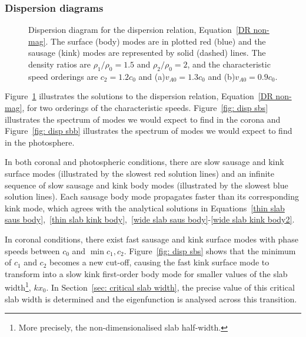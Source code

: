 \documentclass[12pt]{../style-files/ociamthesis}
\begin{document}
\subsubsection{Dispersion diagrams} \label{sec: disp diagrams}

\begin{figure}[]
	\centering
	\caption{Dispersion diagram for the dispersion relation, Equation~\eqref{DR non-mag}. The surface (body) modes are in plotted red (blue) and the sausage (kink) modes are represented by solid (dashed) lines. The density ratios are $\rho_1/\rho_0 = 1.5$ and $\rho_2/\rho_0 = 2$, and the characteristic speed orderings are $c_2 = 1.2c_0$ and (a)$v_{A0} = 1.3c_0$ and (b)$v_{A0} = 0.9c_0$.}
	\label{fig: disp}
\end{figure}

Figure~\ref{fig: disp} illustrates the solutions to the dispersion relation, Equation~\eqref{DR non-mag}, for two orderings of the characteristic speeds. Figure~\ref{fig: disp sbs} illustrates the spectrum of modes we would expect to find in the corona and Figure~\ref{fig: disp sbb} illustrates the spectrum of modes we would expect to find in the photosphere.

In both coronal and photospheric conditions, there are slow sausage and kink surface modes (illustrated by the slowest red solution lines) and an infinite sequence of slow sausage and kink body modes (illustrated by the slowest blue solution lines). Each sausage body mode propagates faster than its corresponding kink mode, which agrees with the analytical solutions in Equations~\eqref{thin slab saus body},~\eqref{thin slab kink body},~\eqref{wide slab saus body}-\eqref{wide slab kink body2}.

In coronal conditions, there exist fast sausage and kink surface modes with phase speeds between $c_0$ and $\min{c_1, c_2}$. Figure~\ref{fig: disp sbs} shows that the minimum of $c_1$ and $c_2$ becomes a new cut-off, causing the fast kink surface mode to transform into a slow kink first-order body mode for smaller values of the slab width\footnote{More precisely, the non-dimensionalised slab half-width.}, $kx_0$. In Section~\ref{sec: critical slab width}, the precise value of this critical slab width is determined and the eigenfunction is analysed across this transition.
\end{document}
